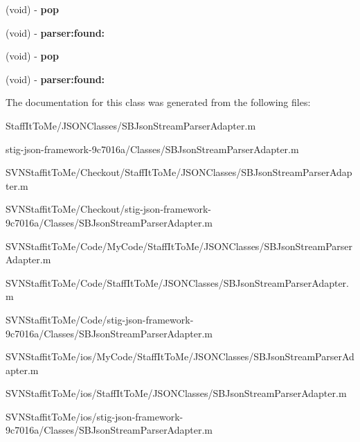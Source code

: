\begin{DoxyCompactItemize}
\item 
\hypertarget{interface_s_b_json_stream_parser_adapter_07_08_a3dc3665abef287573c9fad2a9eabb6b3}{
(void) -\/ {\bfseries pop}}
\label{interface_s_b_json_stream_parser_adapter_07_08_a3dc3665abef287573c9fad2a9eabb6b3}

\item 
\hypertarget{interface_s_b_json_stream_parser_adapter_07_08_af2059c2ce23ed04a633afe6d331291e0}{
(void) -\/ {\bfseries parser\-:found\-:}}
\label{interface_s_b_json_stream_parser_adapter_07_08_af2059c2ce23ed04a633afe6d331291e0}

\item 
\hypertarget{interface_s_b_json_stream_parser_adapter_07_08_a3dc3665abef287573c9fad2a9eabb6b3}{
(void) -\/ {\bfseries pop}}
\label{interface_s_b_json_stream_parser_adapter_07_08_a3dc3665abef287573c9fad2a9eabb6b3}

\item 
\hypertarget{interface_s_b_json_stream_parser_adapter_07_08_af2059c2ce23ed04a633afe6d331291e0}{
(void) -\/ {\bfseries parser\-:found\-:}}
\label{interface_s_b_json_stream_parser_adapter_07_08_af2059c2ce23ed04a633afe6d331291e0}

\end{DoxyCompactItemize}


\-The documentation for this class was generated from the following files\-:\begin{DoxyCompactItemize}
\item 
\-Staff\-It\-To\-Me/\-J\-S\-O\-N\-Classes/\-S\-B\-Json\-Stream\-Parser\-Adapter.\-m\item 
stig-\/json-\/framework-\/9c7016a/\-Classes/\-S\-B\-Json\-Stream\-Parser\-Adapter.\-m\item 
\-S\-V\-N\-Staffit\-To\-Me/\-Checkout/\-Staff\-It\-To\-Me/\-J\-S\-O\-N\-Classes/\-S\-B\-Json\-Stream\-Parser\-Adapter.\-m\item 
\-S\-V\-N\-Staffit\-To\-Me/\-Checkout/stig-\/json-\/framework-\/9c7016a/\-Classes/\-S\-B\-Json\-Stream\-Parser\-Adapter.\-m\item 
\-S\-V\-N\-Staffit\-To\-Me/\-Code/\-My\-Code/\-Staff\-It\-To\-Me/\-J\-S\-O\-N\-Classes/\-S\-B\-Json\-Stream\-Parser\-Adapter.\-m\item 
\-S\-V\-N\-Staffit\-To\-Me/\-Code/\-Staff\-It\-To\-Me/\-J\-S\-O\-N\-Classes/\-S\-B\-Json\-Stream\-Parser\-Adapter.\-m\item 
\-S\-V\-N\-Staffit\-To\-Me/\-Code/stig-\/json-\/framework-\/9c7016a/\-Classes/\-S\-B\-Json\-Stream\-Parser\-Adapter.\-m\item 
\-S\-V\-N\-Staffit\-To\-Me/ios/\-My\-Code/\-Staff\-It\-To\-Me/\-J\-S\-O\-N\-Classes/\-S\-B\-Json\-Stream\-Parser\-Adapter.\-m\item 
\-S\-V\-N\-Staffit\-To\-Me/ios/\-Staff\-It\-To\-Me/\-J\-S\-O\-N\-Classes/\-S\-B\-Json\-Stream\-Parser\-Adapter.\-m\item 
\-S\-V\-N\-Staffit\-To\-Me/ios/stig-\/json-\/framework-\/9c7016a/\-Classes/\-S\-B\-Json\-Stream\-Parser\-Adapter.\-m\end{DoxyCompactItemize}
